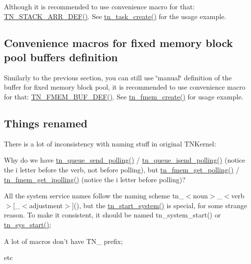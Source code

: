 Although it is recommended to use convenience macro for that\+: {\ttfamily \hyperlink{tn__sys_8h_ad61af0f0e9ab96bdf1ac1bf1e03e3c75}{T\+N\+\_\+\+S\+T\+A\+C\+K\+\_\+\+A\+R\+R\+\_\+\+D\+E\+F()}}. See {\ttfamily \hyperlink{tn__tasks_8h_a548d5adda09d1b4e393b5df0e9e1a7a5}{tn\+\_\+task\+\_\+create()}} for the usage example.\hypertarget{tnkernel_diff_tnkernel_new_api__convenience_macros_fmem}{}\subsection{Convenience macros for fixed memory block pool buffers definition}\label{tnkernel_diff_tnkernel_new_api__convenience_macros_fmem}
Similarly to the previous section, you can still use \char`\"{}manual\char`\"{} definition of the buffer for fixed memory block pool, it is recommended to use convenience macro for that\+: {\ttfamily \hyperlink{tn__fmem_8h_ab45e9c2ad4a64345214f9a912bf76fc3}{T\+N\+\_\+\+F\+M\+E\+M\+\_\+\+B\+U\+F\+\_\+\+D\+E\+F()}}. See {\ttfamily \hyperlink{tn__fmem_8h_a56d47d4a1b6453d959336448a0ce96ac}{tn\+\_\+fmem\+\_\+create()}} for usage example.\hypertarget{tnkernel_diff_tnkernel_diff_api_rename}{}\subsection{Things renamed}\label{tnkernel_diff_tnkernel_diff_api_rename}
There is a lot of inconsistency with naming stuff in original T\+N\+Kernel\+:


\begin{DoxyItemize}
\item Why do we have {\ttfamily \hyperlink{tn__dqueue_8h_af60c61c12ed90f4bcc7d13ca4da8562b}{tn\+\_\+queue\+\_\+send\+\_\+polling()}} / {\ttfamily \hyperlink{tn__dqueue_8h_ac059f15f07625ca25e4aac5790cce1ea}{tn\+\_\+queue\+\_\+isend\+\_\+polling()}} (notice the {\ttfamily i} letter before the verb, not before {\ttfamily polling}), but {\ttfamily \hyperlink{tn__fmem_8h_affea42ad41734fadfe8170b4234ca567}{tn\+\_\+fmem\+\_\+get\+\_\+polling()}} / {\ttfamily \hyperlink{tn__oldsymbols_8h_a4293c359514306825a9007f071b2ad3f}{tn\+\_\+fmem\+\_\+get\+\_\+ipolling()}} (notice the {\ttfamily i} letter before {\ttfamily polling})?
\item All the system service names follow the naming scheme {\ttfamily tn\+\_\+$<$noun$>$\+\_\+$<$verb$>$\mbox{[}\+\_\+$<$adjustment$>$\mbox{]}()}, but the {\ttfamily \hyperlink{tn__oldsymbols_8h_a566625be14a6eed4a3574e3d31e776fc}{tn\+\_\+start\+\_\+system()}} is special, for some strange reason. To make it consistent, it should be named {\ttfamily tn\+\_\+system\+\_\+start()} or {\ttfamily \hyperlink{tn__sys_8h_a62ab25d9d8ca01c02d368968f19e49bf}{tn\+\_\+sys\+\_\+start()}};
\item A lot of macros don't have {\ttfamily T\+N\+\_\+} prefix;
\item etc
\end{DoxyItemize}

